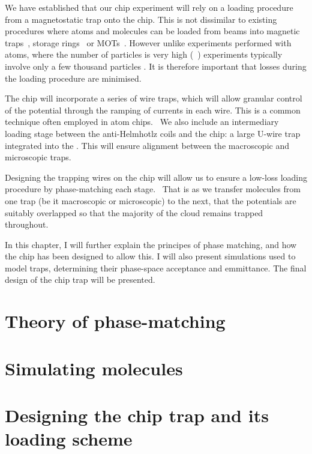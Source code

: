 We have established that our chip experiment will rely on a loading procedure
from a magnetostatic trap onto the chip. This is not dissimilar to existing
procedures where atoms and molecules can be loaded from beams into magnetic
traps~\cite{}, storage rings~\cite{} or MOTs~\cite{}. However unlike
experiments performed with atoms, where the number of particles is very high
(~\cite{}) \CaF experiments typically involve only a few thousand
particles \cite{}. It is therefore important that losses during the loading
procedure are minimised.

The chip will incorporate a series of wire traps, which will allow granular
control of the potential through the ramping of currents in each wire. This is
a common technique often employed in atom chips.~\cite{} We also include an
intermediary loading stage between the anti-Helmhotlz coils and the chip: a
large U-wire trap integrated into the . This will
ensure alignment between the macroscopic and microscopic traps.

Designing the trapping wires on the chip will allow us to ensure a low-loss
loading procedure by phase-matching each stage.~\cite{Crompvoets2005} That is
as we transfer molecules from one trap (be it macroscopic or microscopic) to
the next, that the potentials are suitably overlapped so that the majority of
the cloud remains trapped throughout.

In this chapter, I will further explain the principes of phase matching, and
how the chip has been designed to allow this. I will also present simulations
used to model traps, determining their phase-space acceptance and emmittance.
The final design of the chip trap will be presented.

\section{Theory of phase-matching}

\section{Simulating molecules}

\section{Designing the chip trap and its loading scheme}

